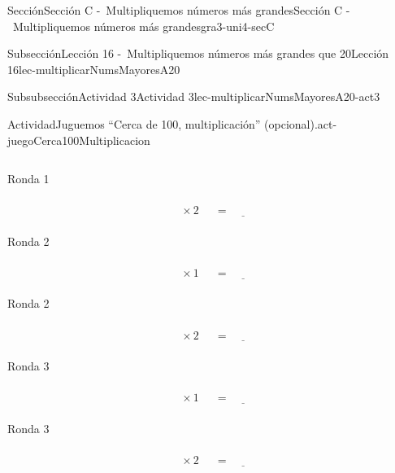 \begin{sectionptx}{Sección}{Sección C -~Multipliquemos números más grandes}{}{Sección C -~Multipliquemos números más grandes}{}{}{gra3-uni4-secC}
\begin{subsectionptx}{Subsección}{Lección 16 -~Multipliquemos números más grandes que 20}{}{Lección 16}{}{}{lec-multiplicarNumsMayoresA20}
\begin{subsubsectionptx}{Subsubsección}{Actividad 3}{}{Actividad 3}{}{}{lec-multiplicarNumsMayoresA20-act3}
\begin{activity}{Actividad}{Juguemos “Cerca de 100, multiplicación” (opcional).}{act-juegoCerca100Multiplicacion}
\begin{sidebyside}{2}{0}{0}{0.1}
\begin{sbspanel}{0.45}
\begin{equation*}
\end{equation*}
%
\end{sbspanel}%
\begin{sbspanel}{0.45}%
Ronda 1%
\par
%
\begin{equation*}
\boxed{\phantom{\frac{00}{00}}} \times 2 \ \boxed{\phantom{\frac{00}{00}}}= \underline{\hspace{1cm}}
\end{equation*}
%
\end{sbspanel}%
\end{sidebyside}%
\begin{sidebyside}{2}{0}{0}{0.1}%
\begin{sbspanel}{0.45}%
Ronda 2%
\par
%
\begin{equation*}
\boxed{\phantom{\frac{00}{00}}} \times 1 \ \boxed{\phantom{\frac{00}{00}}}= \underline{\hspace{1cm}}
\end{equation*}
%
\end{sbspanel}%
\begin{sbspanel}{0.45}%
Ronda 2%
\par
%
\begin{equation*}
\boxed{\phantom{\frac{00}{00}}} \times 2 \ \boxed{\phantom{\frac{00}{00}}}= \underline{\hspace{1cm}}
\end{equation*}
%
\end{sbspanel}%
\end{sidebyside}%
\begin{sidebyside}{2}{0}{0}{0.1}%
\begin{sbspanel}{0.45}%
Ronda 3%
\par
%
\begin{equation*}
\boxed{\phantom{\frac{00}{00}}} \times 1 \ \boxed{\phantom{\frac{00}{00}}}= \underline{\hspace{1cm}}
\end{equation*}
%
\end{sbspanel}%
\begin{sbspanel}{0.45}%
Ronda 3%
\par
%
\begin{equation*}
\boxed{\phantom{\frac{00}{00}}} \times 2 \ \boxed{\phantom{\frac{00}{00}}}= \underline{\hspace{1cm}}
\end{equation*}
%
\end{sbspanel}%
\end{sidebyside}%

\end{activity}
\end{subsubsectionptx}
\end{subsectionptx}
\end{sectionptx}
